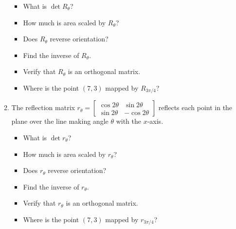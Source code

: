 \documentclass[11pt]{article}
\renewcommand{\vec}[1]{\ensuremath{\mathbf{#1}}}
\begin{document}
\begin{enumerate}
\begin{enumerate}
\begin{itemize}
\item What is $\det R_\theta$?
\item How much is area scaled by $R_\theta$?
\item Does $R_\theta$ reverse orientation?
\item Find the inverse of $R_\theta$.
\item Verify that $R_\theta$ is an orthogonal matrix.
\item Where is the point $(7,3)$ mapped by $R_{3\pi/4}$?
\end{itemize}
\item The reflection matrix $r_\theta  = \begin{bmatrix} \cos 2\theta & \sin 2\theta \\ \sin 2\theta & -\cos 2\theta\end{bmatrix}$ reflects each point in the plane over the line making angle $\theta$ with the $x$-axis.

\begin{itemize}
\item What is $\det r_\theta$?
\item How much is area scaled by $r_\theta$?
\item Does $r_\theta$ reverse orientation?
\item Find the inverse of $r_\theta$.
\item Verify that $r_\theta$ is an orthogonal matrix.
\item Where is the point $(7,3)$ mapped by $r_{3\pi/4}$?
\end{itemize}
\end{enumerate}


\end{enumerate}
\end{document}

